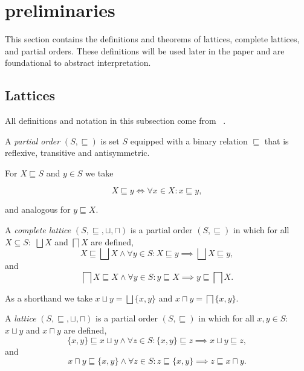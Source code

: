 
\section{preliminaries}\label{sec:preliminaries}
This section contains the definitions and theorems of lattices, complete lattices, and partial orders.
These definitions will be used later in the paper and are foundational to abstract interpretation.

\subsection{Lattices}\label{subsec:lattices}
All definitions and notation in this subsection come from ~\cite{nielson_formal_2019}.


\begin{definition}
    A \emph{partial order} $(S, \sqsubseteq)$ is set $S$ equipped with a binary relation $\sqsubseteq$ that is reflexive, transitive and antisymmetric.
\end{definition}


For $X \sqsubseteq S$ and $y \in S$ we take


\begin{equation}
    X \sqsubseteq y \iff \forall x \in X : x \sqsubseteq y,\label{eq:equation}
\end{equation}


and analogous for $y \sqsubseteq X$.


\begin{definition}
    A \emph{complete lattice} $(S, \sqsubseteq, \sqcup, \sqcap)$ is a partial order $(S, \sqsubseteq)$ in which for all $X \subseteq S:$ $\bigsqcup X$ and $\bigsqcap X$ are defined,
    \begin{equation}
        X \sqsubseteq \bigsqcup X \land \forall y \in S : X \sqsubseteq y \implies \bigsqcup X \sqsubseteq y,\label{eq:equation2}
    \end{equation}
    and
    \begin{equation}
        \bigsqcap X \sqsubseteq X \land \forall y \in S : y \sqsubseteq X \implies y \sqsubseteq \bigsqcap X.\label{eq:equation3}
    \end{equation}
\end{definition}


As a shorthand we take $x \sqcup y = \bigsqcup \{x, y\}$ and $x \sqcap y = \bigsqcap \{x, y\}$.


\begin{definition}
    A \emph{lattice} $(S, \sqsubseteq, \sqcup, \sqcap)$ is a partial order $(S, \sqsubseteq)$ in which for all $x,y \in S:$ $x \sqcup y$ and $x \sqcap y$ are defined,
    \begin{equation}
        \{x, y\} \sqsubseteq x \sqcup y \land \forall z \in S : \{x, y\} \sqsubseteq z \implies x \sqcup y \sqsubseteq z,\label{eq:equation4}
    \end{equation}
    and
    \begin{equation}
        x \sqcap y \sqsubseteq \{x, y\} \land \forall z \in S : z \sqsubseteq \{x, y\} \implies z \sqsubseteq x \sqcap y.\label{eq:equation5}
    \end{equation}
\end{definition}


